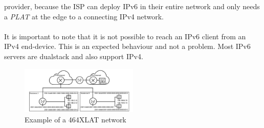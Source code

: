 \documentclass[format=sigconf, natbib=true, nonacm=true]{acmart}
\begin{document}
provider, because the ISP can deploy IPv6 in their entire network and only needs a \textit{PLAT} at the edge to a connecting IPv4 network.\\\\It is important to note that it is not possible to reach an IPv6 client from an IPv4 end-device. This is an expected behaviour and not a problem. Most IPv6 servers are dualstack and also support IPv4.
    \begin{figure}
        \centering
        \includegraphics[width=0.5\textwidth]{images/464_xlat.png}
        \caption{Example of a 464XLAT network}
        \label{fig:646_XLAT}
    \end{figure}
\end{document}
